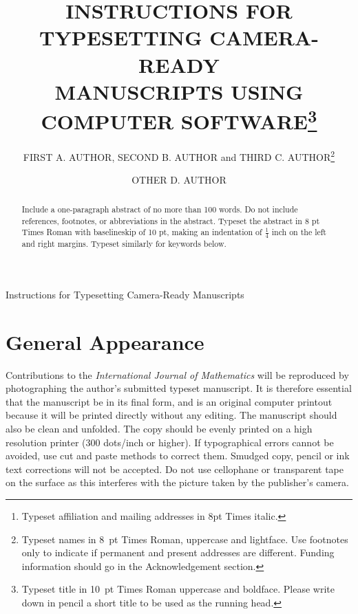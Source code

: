 \documentclass{ws-ijm}
\begin{document}
{Instructions for Typesetting Camera-Ready Manuscripts}

\catchline{}{}{}{}{}

\title{INSTRUCTIONS FOR TYPESETTING CAMERA-READY\\
MANUSCRIPTS USING COMPUTER SOFTWARE\footnote{Typeset title in
10~pt Times Roman uppercase and boldface. Please write
down in pencil a short title to be used as the running head.}}

\author{FIRST A. AUTHOR, SECOND B. AUTHOR and THIRD
C. AUTHOR\footnote{Typeset names in 8~pt Times Roman, uppercase
and lightface.  Use footnotes only to indicate if permanent and
present addresses are different. Funding information should go
in the Acknowledgement section.}}

\address{Full affiliations\footnote{Typeset
affiliation and mailing addresses in 8pt Times italic.} \\
,mailing addresses and telephone number}

\author{OTHER D. AUTHOR}

\address{Full affiliations \\
,mailing addresses and telephone number}

\maketitle

\begin{abstract}
Include a one-paragraph abstract of no more than 100 words. Do not include references, footnotes, or abbreviations in the abstract. Typeset the
abstract in 8 pt Times Roman with baselineskip of 10 pt, making
an indentation of $\frac14$ inch on the left and right margins.
Typeset similarly for keywords below.
\end{abstract}



\section{General Appearance}	%
Contributions to the {\it International Journal of Mathematics}
will be reproduced by photographing the author's
submitted typeset manuscript.  It is therefore essential that
the manuscript be in its final form, and is an original computer
printout because it will be printed directly without any
editing. The manuscript should also be clean and unfolded. The
copy should be evenly printed on a high resolution printer (300
dots/inch or higher). If typographical errors cannot be avoided,
use cut and paste methods to correct them. Smudged copy, pencil
or ink text corrections will not be accepted. Do not use
cellophane or transparent tape on the surface as this interferes
with the picture taken by the publisher's camera.
\end{document}

